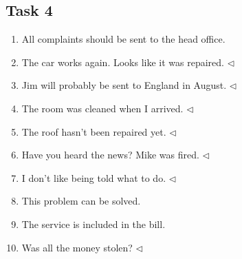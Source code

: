 \subsection*{Task 4}

\begin{enumerate}
	\item All complaints should be sent to the head office.
	\item The car works again. Looks like it was repaired. $ \triangleleft $
	\item Jim will probably be sent to England in August. $ \triangleleft $
	\item The room was cleaned when I arrived. $ \triangleleft $
	\item The roof hasn't been repaired yet. $ \triangleleft $
	\item Have you heard the news? Mike was fired. $ \triangleleft $
	\item I don't like being told what to do. $ \triangleleft $
	\item This problem can be solved.
	\item The service is included in the bill.
	\item Was all the money stolen? $ \triangleleft $
\end{enumerate}

